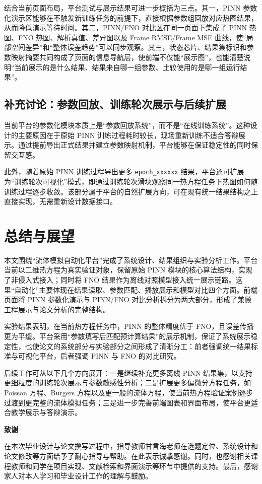 \documentclass[UTF8,zihao=-4]{oucart}
\begin{document}
结合当前页面布局，平台测试与展示结果可进一步概括为三点。其一，PINN 参数化演示区能够在不触发新训练任务的前提下，直接根据参数组回放对应热图结果，从而降低演示等待时间。其二，PINN/FNO 对比区在同一页面下集成了 PINN 热图、FNO 热图、解析真值、差异图以及 Frame RMSE/Frame MSE 曲线，使“局部空间差异”和“整体误差趋势”可以同步观察。其三，状态芯片、结果集标识和参数映射摘要共同构成了页面的信息导航层，使前端不仅能“展示图”，也能清楚说明“当前展示的是什么结果、结果来自哪一组参数、比较使用的是哪一组运行结果”。

\subsection{补充讨论：参数回放、训练轮次展示与后续扩展}

当前平台的参数化模块本质上是“参数回放系统”，而不是“在线训练系统”。这种设计的主要原因在于原始 PINN 训练过程耗时较长，现场重新训练不适合答辩展示。通过提前导出正式结果并建立参数映射机制，平台能够在保证稳定性的同时保留交互感。

此外，随着原始 PINN 训练过程导出更多 \texttt{epoch\_xxxxxx} 结果，平台还可扩展为“训练轮次可视化”模式，即通过训练轮次滑块观察同一热方程任务下热图如何随训练过程逐步收敛。该部分属于平台的自然扩展方向，可在现有统一结果结构之上直接实现，无需重新设计数据接口。

\section{总结与展望}

本文围绕“流体模拟自动化平台”完成了系统设计、结果组织与实验分析工作。平台当前以二维热方程为真实验证对象，保留原始 PINN 模块的核心算法结构，实现了非侵入式接入；同时将 FNO 结果作为离线对照模型接入统一展示链路。这里“自动化”主要体现在结果读取、参数匹配、播放展示和模型对比四个方面。前端页面将 PINN 参数化演示与 PINN/FNO 对比分析拆分为两大部分，形成了兼顾工程展示与论文分析的完整结构。

实验结果表明，在当前热方程任务中，PINN 的整体精度优于 FNO，且误差传播更为平缓。平台采用“参数填写后匹配预计算结果”的展示机制，保证了系统展示稳定性，也使论文的系统部分与实验部分之间形成了清晰分工：前者强调统一结果标准与可视化平台，后者强调 PINN 与 FNO 的对比研究。

后续工作可从以下几个方向展开：一是继续补充更多离线 PINN 结果集，以支持更细粒度的训练轮次展示与参数敏感性分析；二是扩展更多偏微分方程任务，如 Poisson 方程、Burgers 方程以及更一般的流体方程，使当前热方程验证案例逐步过渡到更完整的流体模拟任务；三是进一步完善前端图表和界面布局，使平台更适合教学展示与答辩演示。

\clearpage
{}
{}



\clearpage
{}
\begin{center}
     \textbf{致谢} \\
\end{center}

在本次毕业设计与论文撰写过程中，指导教师甘言海老师在选题定位、系统设计和论文修改等方面给予了耐心指导与帮助。在此表示诚挚感谢。同时，也感谢相关课程教师和同学在项目实现、文献检索和界面演示等环节中提供的支持。最后，感谢家人对本人学习和毕业设计工作的理解与鼓励。
\end{document}
